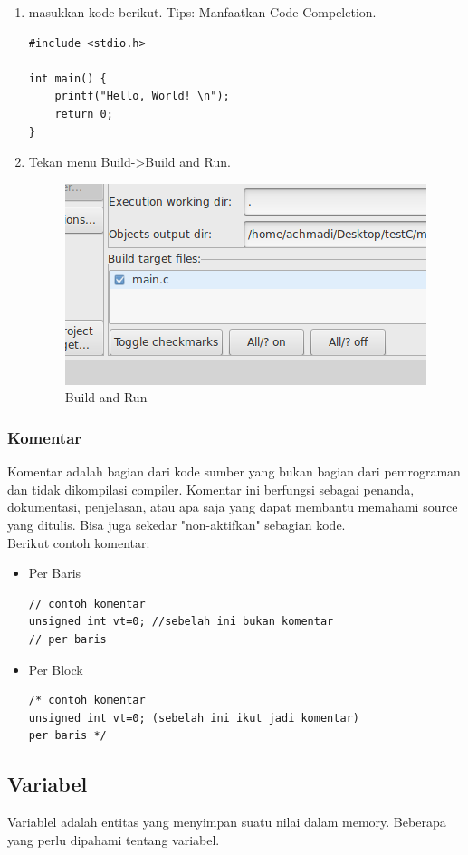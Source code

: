 \documentclass[12pt,]{article}
\begin{document}
\begin{enumerate}
		\item masukkan kode berikut.
		Tips: Manfaatkan Code Compeletion.
		\begin{verbatim}
#include <stdio.h>

int main() {
	printf("Hello, World! \n");
	return 0;
}
		\end{verbatim}
		\item Tekan menu Build->Build and Run.
		\begin{figure}[H]
			\centering
			\includegraphics[width=0.4\linewidth]{images/c_cb_9}
			\caption{Build and Run}
		\end{figure}
			
	\end{enumerate}

	\subsubsection{Komentar}
	Komentar adalah bagian dari kode sumber yang bukan bagian dari pemrograman dan tidak dikompilasi compiler.
	Komentar ini berfungsi sebagai penanda, dokumentasi, penjelasan, atau apa saja yang dapat membantu memahami source yang ditulis.
	Bisa juga sekedar "non-aktifkan" sebagian kode.\\
	Berikut contoh komentar:
	\begin{itemize}
		\item Per Baris
		\begin{verbatim}
// contoh komentar
unsigned int vt=0; //sebelah ini bukan komentar
// per baris
		\end{verbatim}
		
		\item Per Block
		\begin{verbatim}
/* contoh komentar
unsigned int vt=0; (sebelah ini ikut jadi komentar)
per baris */
		\end{verbatim}
	\end{itemize}

	\newpage
	\subsection{Variabel}
	Variablel adalah entitas yang menyimpan suatu nilai dalam memory.
	Beberapa yang perlu dipahami tentang variabel.
	
\end{document}
